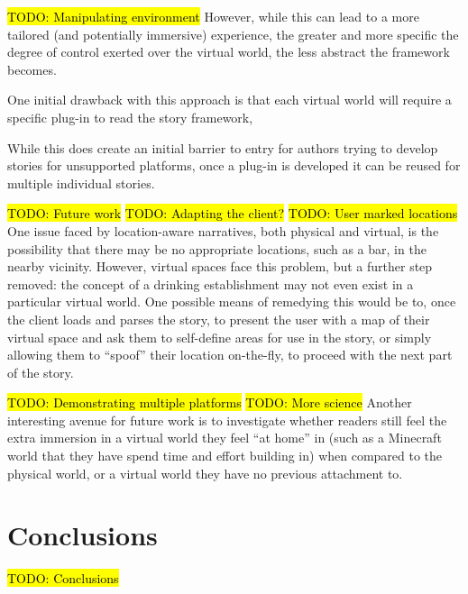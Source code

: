 \documentclass{acm}
\newcommand{\TODO}[1]{\hl{TODO: #1}}
\begin{document}
\TODO{Manipulating environment}
However, while this can lead to a more tailored (and potentially immersive) experience, the greater and more specific the degree of control exerted over the virtual world, the less abstract the framework becomes.

One initial drawback with this approach is that each virtual world will require a specific plug-in to read the story framework, 

While this does create an initial barrier to entry for authors trying to develop stories for unsupported platforms, once a plug-in is developed it can be reused for multiple individual stories.

\TODO{Future work}
\TODO{Adapting the client?}
\TODO{User marked locations}
One issue faced by location-aware narratives, both physical and virtual, is the possibility that there may be no appropriate locations, such as a bar, in the nearby vicinity. However, virtual spaces face this problem, but a further step removed: the concept  of a drinking establishment may not even exist in a particular virtual world. One possible means of remedying this would be to, once the client loads and parses the story, to present the user with a map of their virtual space and ask them to self-define areas for use in the story, or simply allowing them to ``spoof'' their location on-the-fly, to proceed with the next part of the story.

\TODO{Demonstrating multiple platforms}
\TODO{More science}
Another interesting avenue for future work is to investigate whether readers still feel the extra immersion in a virtual world they feel ``at home'' in (such as a Minecraft world that they have spend time and effort building in) when compared to the physical world, or a virtual world they have no previous attachment to.

\section{Conclusions}
\TODO{Conclusions}



\end{document}
